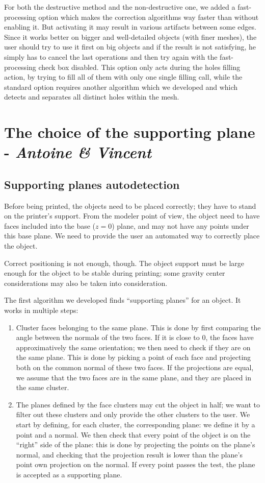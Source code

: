 \documentclass{report}
\begin{document}
For both the destructive method and the non-destructive one, we added a fast-processing option which makes the correction algorithms way faster than without enabling it. But activating it may result in various artifacts between some edges. Since it works better on bigger and well-detailed objects (with finer meshes), the user should try to use it first on big objects and if the result is not satisfying, he simply has to cancel the last operations and then try again with the fast-processing check box disabled. This option only acts during the holes filling action, by trying to fill all of them with only one single filling call, while the standard option requires another algorithm which we developed and which detects and separates all distinct holes within the mesh.


\section{The choice of the supporting plane - \textit{Antoine \& Vincent}}

\subsection{Supporting planes autodetection}
Before being printed, the objects need to be placed correctly; they have to stand on the printer’s support. From the modeler point of view, the object need to have faces included into the base ($z = 0$) plane, and may not have any points under this base plane. We need to provide the user an automated way to correctly place the object.

Correct positioning is not enough, though. The object support must be large enough for the object to be stable during printing; some gravity center considerations may also be taken into consideration.

The first algorithm we developed finds “supporting planes” for an object. It works in multiple steps:
\begin{enumerate}
\item Cluster faces belonging to the same plane. This is done by first comparing the angle between the normals of the two faces. If it is close to $0$, the faces have approximatively the same orientation; we then need to check if they are on the same plane. This is done by picking a point of each face and projecting both on the common normal of these two faces. If the projections are equal, we assume that the two faces are in the same plane, and they are placed in the same cluster.
\item The planes defined by the face clusters may cut the object in half; we want to filter out these clusters and only provide the other clusters to the user. We start by defining, for each cluster, the corresponding plane: we define it by a point and a normal. We then check that every point of the object is on the “right” side of the plane: this is done by projecting the points on the plane’s normal, and checking that the projection result is lower than the plane’s point own projection on the normal. If every point passes the test, the plane is accepted as a supporting plane.
\end{enumerate}
\end{document}
